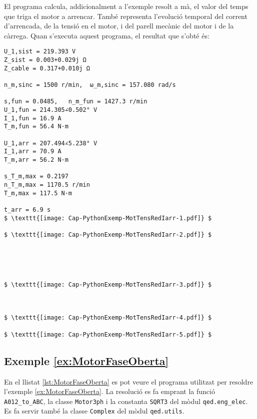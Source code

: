 El programa calcula, addicionalment a l'exemple resolt a mà, el valor  del temps que triga el motor a arrencar. També  representa l'evolució temporal del  corrent d'arrencada, de la tensió en el motor, i del parell mecànic del motor i de la càrrega.
Quan s'executa aquest programa, el resultat que s'obté és:
\lstset{
	language=,
	numbers=none,
	frame=none
}
\begin{lstlisting}[mathescape=true]
U_1,sist = 219.393 V
Z_sist = 0.003+0.029j Ω
Z_cable = 0.317+0.010j Ω

n_m,sinc = 1500 r/min,  ω_m,sinc = 157.080 rad/s

s,fun = 0.0485,   n_m_fun = 1427.3 r/min
U_1,fun = 214.305∠0.502° V
I_1,fun = 16.9 A
T_m,fun = 56.4 N·m

U_1,arr = 207.494∠5.238° V
I_1,arr = 70.9 A
T_m,arr = 56.2 N·m

s_T_m,max = 0.2197
n_T_m,max = 1170.5 r/min
T_m,max = 117.5 N·m

t_arr = 6.9 s
$ \texttt{[image: Cap-PythonExemp-MotTensRedIarr-1.pdf]} $

$ \texttt{[image: Cap-PythonExemp-MotTensRedIarr-2.pdf]} $





$ \texttt{[image: Cap-PythonExemp-MotTensRedIarr-3.pdf]} $



$ \texttt{[image: Cap-PythonExemp-MotTensRedIarr-4.pdf]} $

$ \texttt{[image: Cap-PythonExemp-MotTensRedIarr-5.pdf]} $
\end{lstlisting} 


\hypertarget{exemple:MotorFaseOberta}{\subsection{Exemple \ref*{ex:MotorFaseOberta} \MotorFaseOberta}}
En el llistat \vref{lst:MotorFaseOberta} es pot veure el programa utilitzat per resoldre l'exemple \vref{ex:MotorFaseOberta}. La resolució es fa emprant  la funció \texttt{A012\_to\_ABC},  la classe \texttt{Motor3ph} i la constanta \texttt{SQRT3} del mòdul \texttt{qed.eng\_elec}.  Es fa servir també la classe \texttt{Complex} del mòdul \texttt{qed.utils}.


